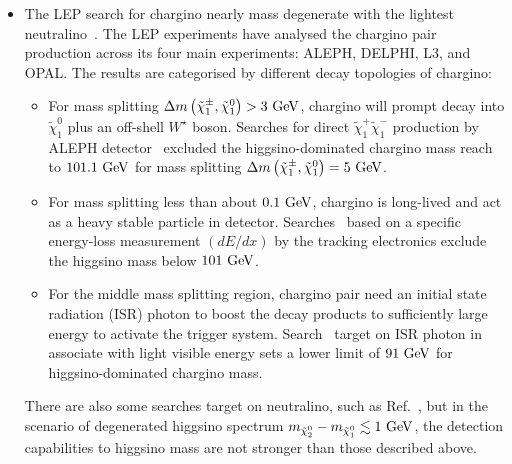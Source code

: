 \documentclass[letterpaper,11pt]{article}
\begin{document}
\begin{itemize}
\item The LEP search for chargino nearly mass degenerate with the lightest neutralino~\cite{Abdallah:2002aik, DELPHI:1999jsl, ALEPH:2002gap, L3:1999twz, DELPHI:1997tcq}. The LEP experiments have analysed the chargino pair production across its four main experiments: ALEPH, DELPHI, L3, and OPAL. The results are categorised by different decay topologies of chargino: 
	\begin{itemize}
	\item For mass splitting $\Delta m \left( \tilde{\chi}_1^\pm, \tilde{\chi}_1^0 \right) > 3~{\rm GeV}$, chargino will prompt decay into $\tilde{\chi}_1^0$ plus an off-shell $W^{\star}$ boson. Searches for direct $\tilde{\chi}_1^+ \tilde{\chi}_1^-$ production by ALEPH detector~\cite{ALEPH:1999tew, ALEPH:2000qvz} excluded the higgsino-dominated chargino mass reach to $101.1~{\rm GeV}$ for mass splitting $\Delta m \left( \tilde{\chi}_1^\pm, \tilde{\chi}_1^0 \right) = 5~{\rm GeV}$. 
	\item For mass splitting less than about $0.1~{\rm GeV}$, chargino is long-lived  and act as a heavy stable particle in detector. Searches~\cite{ALEPH:1997siq, Antonelli:2001exa, ALEPH:2002ijn} based on a specific energy-loss measurement $(dE/dx)$ by the tracking electronics exclude the higgsino mass below $101~{\rm GeV}$.  
	\item For the middle mass splitting region, chargino pair need an initial state radiation (ISR) photon to boost the decay products to sufficiently large energy to activate the trigger system. Search~\cite{ALEPH:2002gap} target on ISR photon in associate with light visible energy sets a lower limit of $91~{\rm GeV}$ for higgsino-dominated chargino mass.
	\end{itemize}
	There are also some searches target on neutralino, such as Ref.~\cite{DELPHI:2000ijd}, but in the scenario of degenerated higgsino spectrum $m_{\tilde{\chi}_2^0} - m_{\tilde{\chi}_1^0} \lesssim 1~{\rm GeV}$, the detection capabilities to higgsino mass are not stronger than those described above.     


\end{itemize}
\end{document}
